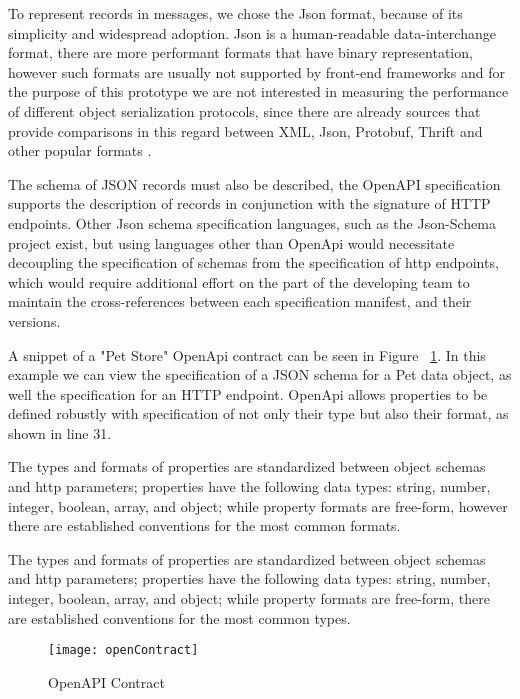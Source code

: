 To represent records in messages, we chose the Json format, because of its simplicity and widespread adoption.
Json is a human-readable data-interchange format,
there are more performant formats that have binary representation,
however such formats are usually not supported by front-end frameworks and for the purpose of this prototype
we are not interested in measuring the performance of different object serialization protocols, since
there are already sources that provide comparisons in this regard between XML, Json, Protobuf, Thrift and other popular formats \cite{serializationBenchmark}.

The schema of JSON records must also be described,
the OpenAPI specification supports the description of records
in conjunction with the signature of HTTP endpoints.
Other Json schema specification languages, such as the Json-Schema project
exist, but using languages other than OpenApi would necessitate decoupling the specification of schemas from the specification
of http endpoints, which would require additional effort on the part of the developing team to maintain the cross-references
between each specification manifest, and their versions.

A snippet of a "Pet Store" OpenApi contract can be seen in Figure ~\ref{fig:open_contract}.
In this example we can view the specification of a JSON schema for a Pet data object,
as well the specification for an HTTP endpoint.
OpenApi allows properties to be defined robustly with specification of not only their type but also their format, as shown in line 31.

The types and formats of properties are standardized between object schemas and http parameters;
properties have the following data types: string, number, integer, boolean, array, and object;
while property formats are free-form, however there are established conventions for the most common formats.

The types and formats of properties are standardized between object schemas and http parameters;
properties have the following data types: string, number, integer, boolean, array, and object;
while property formats are free-form, there are established conventions for the most common types.

\begin{figure}[htbp]
    \centering
    \texttt{[image: openContract]}
    \caption{OpenAPI Contract}
    \label{fig:open_contract}
\end{figure}

\newpage

